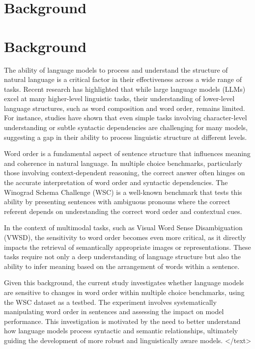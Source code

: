 \documentclass{article}
\begin{document}
\section{Background}
\section{Background}

The ability of language models to process and understand the structure of natural language is a critical factor in their effectiveness across a wide range of tasks. Recent research has highlighted that while large language models (LLMs) excel at many higher-level linguistic tasks, their understanding of lower-level language structures, such as word composition and word order, remains limited. For instance, studies have shown that even simple tasks involving character-level understanding or subtle syntactic dependencies are challenging for many models, suggesting a gap in their ability to process linguistic structure at different levels.

Word order is a fundamental aspect of sentence structure that influences meaning and coherence in natural language. In multiple choice benchmarks, particularly those involving context-dependent reasoning, the correct answer often hinges on the accurate interpretation of word order and syntactic dependencies. The Winograd Schema Challenge (WSC) is a well-known benchmark that tests this ability by presenting sentences with ambiguous pronouns where the correct referent depends on understanding the correct word order and contextual cues. 

In the context of multimodal tasks, such as Visual Word Sense Disambiguation (VWSD), the sensitivity to word order becomes even more critical, as it directly impacts the retrieval of semantically appropriate images or representations. These tasks require not only a deep understanding of language structure but also the ability to infer meaning based on the arrangement of words within a sentence.

Given this background, the current study investigates whether language models are sensitive to changes in word order within multiple choice benchmarks, using the WSC dataset as a testbed. The experiment involves systematically manipulating word order in sentences and assessing the impact on model performance. This investigation is motivated by the need to better understand how language models process syntactic and semantic relationships, ultimately guiding the development of more robust and linguistically aware models.
</text>
\end{document}
